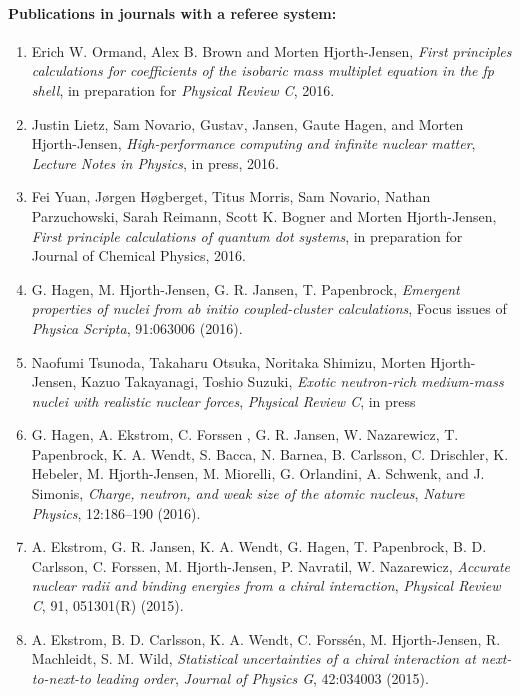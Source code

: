 \documentclass[%
oneside,                 %
final,                   %
10pt]{article}
\begin{document}
\noindent
\paragraph{Publications in journals with a referee system:}
\begin{enumerate}
\item Erich W. Ormand, Alex B. Brown and Morten Hjorth-Jensen, \emph{First principles calculations for coefficients of the isobaric mass multiplet equation in the fp shell}, in preparation for \emph{Physical Review C}, 2016. 

\item Justin Lietz, Sam Novario, Gustav, Jansen, Gaute Hagen, and Morten Hjorth-Jensen, \emph{High-performance computing and infinite nuclear matter}, \emph{Lecture Notes in Physics}, in press, 2016.

\item Fei Yuan, Jørgen Høgberget, Titus Morris, Sam Novario, Nathan Parzuchowski, Sarah Reimann, Scott K. Bogner and Morten Hjorth-Jensen,   \emph{First principle calculations of quantum dot systems}, in preparation for Journal of Chemical Physics, 2016.

\item G. Hagen, M. Hjorth-Jensen, G. R. Jansen, T. Papenbrock, \emph{Emergent properties of nuclei from ab initio coupled-cluster calculations}, Focus issues of \emph{Physica Scripta}, 91:063006 (2016).

\item Naofumi Tsunoda, Takaharu Otsuka, Noritaka Shimizu, Morten Hjorth-Jensen, Kazuo Takayanagi, Toshio Suzuki, \emph{Exotic neutron-rich medium-mass nuclei with realistic nuclear forces}, \emph{Physical Review C}, in press

\item G. Hagen, A. Ekstrom, C. Forssen , G. R. Jansen, W. Nazarewicz, T. Papenbrock, K. A. Wendt, S. Bacca, N. Barnea, B. Carlsson, C. Drischler, K. Hebeler, M. Hjorth-Jensen, M. Miorelli, G. Orlandini, A. Schwenk, and J. Simonis,  \emph{Charge, neutron, and weak size of the atomic nucleus},  \emph{Nature Physics}, 12:186–190 (2016).

\item A. Ekstrom, G. R. Jansen, K. A. Wendt, G. Hagen, T. Papenbrock, B. D. Carlsson, C. Forssen, M. Hjorth-Jensen, P. Navratil, W. Nazarewicz,   \emph{Accurate nuclear radii and binding energies from a chiral interaction}, \emph{Physical Review C}, 91, 051301(R) (2015).

\item A. Ekstrom, B. D. Carlsson, K. A. Wendt, C. Forssén, M. Hjorth-Jensen, R. Machleidt, S. M. Wild,  \emph{Statistical uncertainties of a chiral interaction at next-to-next-to leading order},   \emph{Journal of Physics G}, 42:034003 (2015).


\end{enumerate}
\end{document}
